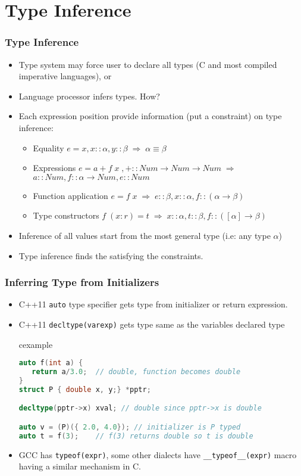 \section{Type Inference}
\begin{frame}
\frametitle{Type Inference}
\begin{itemize}
\item Type system may force user to declare all types (C and most compiled imperative
languages), or
\item Language processor infers types. How?
\item Each expression position provide information (put a constraint)
on type inference:
\begin{itemize}
\item Equality $e=x, x::\alpha, y::\beta \;\Rightarrow\; \alpha\equiv\beta$
\item Expressions $e=a+f\;x \;,
+::Num \rightarrow Num \rightarrow Num 
\;\Rightarrow\;$ \\
$a::Num, 
f::\alpha \rightarrow Num,
e::Num$
\item Function application $e=f\;x \;\Rightarrow \; e::\beta, x::\alpha,
f::(\alpha \rightarrow \beta)$ 
\item Type constructors $f\;(x:r) = t \;\Rightarrow \; x::\alpha, t::\beta,
f::([\alpha] \rightarrow \beta)$
\end{itemize}
\item Inference of all values start from the most general type (i.e: any type
$\alpha$)
\item Type inference finds the  satisfying the
constraints.
\end{itemize}
\end{frame}

\begin{frame}[fragile]
\frametitle{Inferring Type from Initializers}
\begin{itemize}
\item C++11 \lstinline{auto} type specifier gets type from initializer or return expression.
\item C++11 \lstinline{decltype(varexp)} gets type same as the variables declared type\\[.5em]
\begin{beamercolorbox}{cexample}
\begin{lstlisting}[language=C++]
auto f(int a) {  
   return a/3.0;  // double, function becomes double
}  
struct P { double x, y;} *pptr;

decltype(pptr->x) xval; // double since pptr->x is double

auto v = (P)({ 2.0, 4.0}); // initializer is P typed
auto t = f(3);    // f(3) returns double so t is double
\end{lstlisting}
\end{beamercolorbox}
\item GCC has \lstinline!typeof(expr)!, some other dialects have \lstinline!__typeof__(expr)! macro having a similar mechanism in C.
\end{itemize}
\end{frame}

